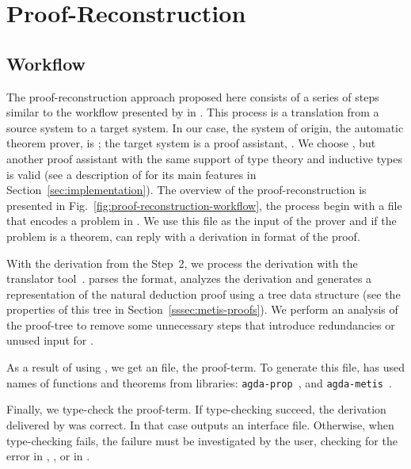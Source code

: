 \documentclass[../main.tex]{subfiles}
\begin{document}

\section{Proof-Reconstruction}
\label{sec:proof-reconstruction}

\subsection{Workflow}
\label{ssec:workflow}



The proof-reconstruction approach proposed here consists of a series
of steps similar to the workflow presented by \citeauthor{sultana2015} in
\cite{sultana2015}. This process is a translation from a source
system to a target system. In our case, the system of origin, the
automatic theorem prover, is \Metis; the target system is a proof
assistant, \Agda. We choose \Agda, but another proof assistant with the same support of type theory and inductive types is valid (see a description of \Agda for its main features in
Section~\ref{sec:implementation}).
The overview of the proof-reconstruction is presented in
Fig.~\ref{fig:proof-reconstruction-workflow}, the process begin with
a \TPTP file that encodes a problem in \CPL. We use this file as the
input of the \Metis prover and if the problem is a theorem, \Metis can reply with a derivation in \TSTP format of the proof.

With the \TSTP  derivation from the Step~2, we process the derivation with the \Athena translator tool~\cite{Athena}.
\Athena parses the \TSTP format, analyzes the
derivation and generates a representation of the natural deduction
proof using a tree data structure (see the properties
of this tree in Section~\ref{sssec:metis-proofs}).
We perform an analysis of the proof-tree to remove some
unnecessary steps that introduce redundancies or unused input for
\Athena.

As a result of using \Athena, we get an \Agda file, the proof-term. To generate this file, \Athena has used names of functions and theorems from \Agda libraries:
\texttt{agda-prop}~\cite{AgdaProp}, and \texttt{agda-metis}~\cite{AgdaMetis}.


Finally, we type-check the \Agda proof-term. If type-checking
succeed, the \TSTP derivation delivered by \Metis was correct.
In that case \Agda outputs an interface file.
Otherwise, when type-checking fails, the failure must be
investigated by the user, checking for the error in \Metis, \Athena,
or in \Agda.
\end{document}
